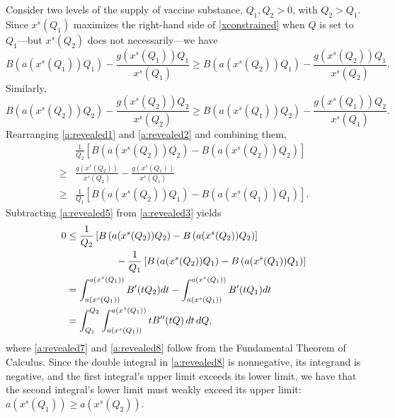 \documentclass[12pt]{article}
\newcommand{\general}{g}
\newcommand{\average}{a}
\newcommand{\benefit}{B}
\newcommand{\xshort}{x^{s}}
\begin{document}
Consider two levels of the supply of vaccine substance, $Q_1, Q_2 > 0$, with $Q_2 > Q_1$. Since $\xshort(Q_1)$ maximizes the right-hand side of \eqref{xconstrained} when $Q$ is set to $Q_1$---but $\xshort(Q_2)$ does not necessarily---we have
\begin{equation}
\label{a:revealed1}
\benefit \left( \average(\xshort(Q_1)) Q_1 \right)- \frac{\general(\xshort(Q_1)) Q_1 }{\xshort(Q_1)} \geq \benefit \left( \average(\xshort(Q_2)) Q_1 \right) - 
\frac{\general(\xshort(Q_2)) Q_1}{\xshort(Q_2)}.
\end{equation}
Similarly,
\begin{equation}
\label{a:revealed2}
\benefit \left( \average(\xshort(Q_2)) Q_2 \right) - \frac{\general(\xshort(Q_2)) Q_2}{\xshort(Q_2)} \geq \benefit \left( \average(\xshort(Q_1)) Q_2 \right) - 
\frac{\general(\xshort(Q_1)) Q_2}{\xshort(Q_1)}.
\end{equation}
Rearranging \eqref{a:revealed1} and \eqref{a:revealed2} and combining them,
\begin{align}
& \frac{1}{Q_2} \left[ \benefit \left( a(\xshort(Q_2)) Q_2 \right) - \benefit \left( a(\xshort(Q_2)) Q_2 \right) \right]  \label{a:revealed3} \\
\geq & \frac{\general(\xshort(Q_2))}{\xshort(Q_2)} -  \frac{\general(\xshort(Q_1))}{\xshort(Q_1)} \label{a:revealed4} \\
\geq & \frac{1}{Q_1} \left[ \benefit \left( a(\xshort(Q_2)) Q_1 \right) - \benefit \left( a(\xshort(Q_1)) Q_1 \right) \right].  \label{a:revealed5} 
\end{align}
Subtracting \eqref{a:revealed5} from \eqref{a:revealed3} yields
\begin{align}
0 & \leq \frac{1}{Q_2} \left[ \benefit \left( a(\xshort(Q_2)) Q_2 \right) - \benefit \left( a(\xshort(Q_2)) Q_2 \right) \right] \notag \\
 & \hspace{5em} - \frac{1}{Q_1} \left[ \benefit \left( a(\xshort(Q_2)) Q_1 \right) - \benefit \left( a(\xshort(Q_1)) Q_1 \right) \right] \label{a:revealed6} \\
& = \int_{\average(\xshort(Q_1))}^{\average(\xshort(Q_1))} \benefit'(t Q_2) dt - \int_{\average(\xshort(Q_1))}^{\average(\xshort(Q_1))} \benefit'(t Q_1) dt \label{a:revealed7} \\
& = \int_{Q_1}^{Q_2} \int_{\average(\xshort(Q_1))}^{\average(\xshort(Q_1))} t \benefit''(tQ) \, dt \, dQ, \label{a:revealed8}
\end{align}
where \eqref{a:revealed7} and \eqref{a:revealed8} follow from the Fundamental Theorem of Calculus. Since the double integral in \eqref{a:revealed8} is nonnegative, its integrand is negative, and the first integral's upper limit exceeds its lower limit, we have that the second integral's lower limit must weakly exceed its upper limit: $\average(\xshort(Q_1)) \geq \average(\xshort(Q_2))$. 
\end{document}
